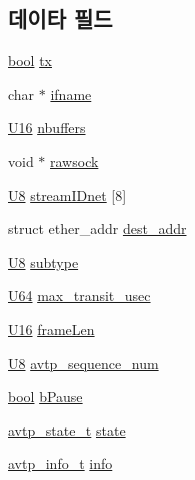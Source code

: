 \subsection*{데이타 필드}
\begin{DoxyCompactItemize}
\item 
\hyperlink{avb__gptp_8h_af6a258d8f3ee5206d682d799316314b1}{bool} \hyperlink{structavtp__stream__t_a3b1e88519ca75747960d51b86b2c5e95}{tx}
\item 
char $\ast$ \hyperlink{structavtp__stream__t_a57634e15933b3c82405e0bbe1e270d1b}{ifname}
\item 
\hyperlink{openavb__types__base__pub_8h_a0a0a322d5fa4a546d293a77ba8b4a71f}{U16} \hyperlink{structavtp__stream__t_a94614663db649ac71090a1f634aefd98}{nbuffers}
\item 
void $\ast$ \hyperlink{structavtp__stream__t_afe47f2588e837096d884e9cbb94a7d20}{rawsock}
\item 
\hyperlink{openavb__types__base__pub_8h_aa63ef7b996d5487ce35a5a66601f3e73}{U8} \hyperlink{structavtp__stream__t_a9b673f6e12b6cd5b67db92b5df0eb123}{stream\+I\+Dnet} \mbox{[}8\mbox{]}
\item 
struct ether\+\_\+addr \hyperlink{structavtp__stream__t_a339610ccd1360cfca1bafde0e16ef3d1}{dest\+\_\+addr}
\item 
\hyperlink{openavb__types__base__pub_8h_aa63ef7b996d5487ce35a5a66601f3e73}{U8} \hyperlink{structavtp__stream__t_ad61c2796f8f447c2ca8979f4aeccf351}{subtype}
\item 
\hyperlink{openavb__types__base__pub_8h_a25809e0734a149248fcf5831efa4e33d}{U64} \hyperlink{structavtp__stream__t_a03a0af93a04672d910ac9108e32f7ab6}{max\+\_\+transit\+\_\+usec}
\item 
\hyperlink{openavb__types__base__pub_8h_a0a0a322d5fa4a546d293a77ba8b4a71f}{U16} \hyperlink{structavtp__stream__t_a62d47babdcc48dfcfc59166ca8d2c28b}{frame\+Len}
\item 
\hyperlink{openavb__types__base__pub_8h_aa63ef7b996d5487ce35a5a66601f3e73}{U8} \hyperlink{structavtp__stream__t_a56abc5c750ed448e7ca88ac571feb962}{avtp\+\_\+sequence\+\_\+num}
\item 
\hyperlink{avb__gptp_8h_af6a258d8f3ee5206d682d799316314b1}{bool} \hyperlink{structavtp__stream__t_a094a344391aa86a98299bac3deb91ce6}{b\+Pause}
\item 
\hyperlink{structavtp__state__t}{avtp\+\_\+state\+\_\+t} \hyperlink{structavtp__stream__t_a8d80202ecf85686d01d46652b7923422}{state}
\item 
\hyperlink{structavtp__info__t}{avtp\+\_\+info\+\_\+t} \hyperlink{structavtp__stream__t_a180aa6c9020618ff0caab084c56759f9}{info}

\end{DoxyCompactItemize}
